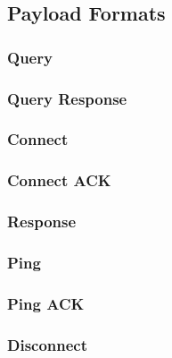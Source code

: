 \documentclass{l4proj}
\begin{document}
\subsection{Payload Formats} %
\label{sub:payload_formats}

\subsubsection{Query} %
\label{ssub:query}
		

\subsubsection{Query Response} %
\label{ssub:query_response}


\subsubsection{Connect} %
\label{ssub:connect}


\subsubsection{Connect ACK} %
\label{ssub:connect_ack}


\subsubsection{Response} %
\label{ssub:response}


\subsubsection{Ping} %
\label{ssub:ping}


\subsubsection{Ping ACK} %
\label{ssub:ping_ack}


\subsubsection{Disconnect} %
\label{ssub:disconnect}
\end{document}
